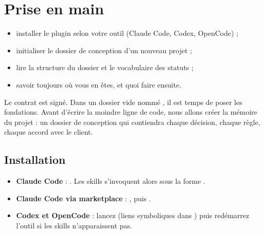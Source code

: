 \chapter{Prise en main}\label{ch:prise}

\begin{objectifs}[Objectifs]
\begin{itemize}
  \item installer le plugin selon votre outil (Claude Code, Codex, OpenCode) ;
  \item initialiser le dossier de conception d'un nouveau projet ;
  \item lire la structure du dossier et le vocabulaire des statuts ;
  \item savoir toujours où vous en êtes, et quoi faire ensuite.
\end{itemize}
\end{objectifs}

\begin{situation}
Le contrat est signé. Dans un dossier vide nommé , il est temps de poser les fondations.
Avant d'écrire la moindre ligne de code, nous allons créer la mémoire du projet : un dossier de
conception qui contiendra chaque décision, chaque règle, chaque accord avec le client.
\end{situation}

\section{Installation}
\begin{itemize}
  \item \textbf{Claude Code} : . Les skills s'invoquent alors sous la forme .
  \item \textbf{Claude Code via marketplace} : , puis .
  \item \textbf{Codex et OpenCode} : lancez  (liens symboliques dans ) puis redémarrez l'outil si les skills n'apparaissent pas.
\end{itemize}

